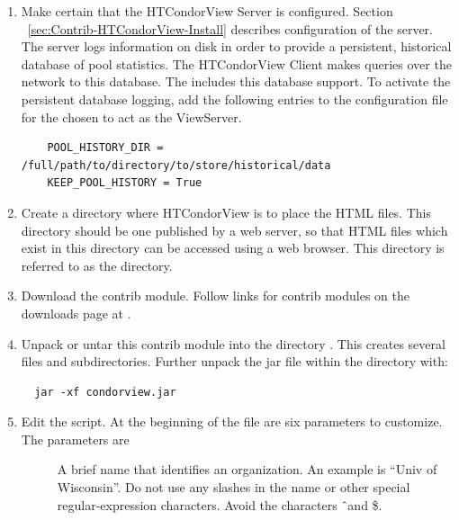 \begin{enumerate}

\item Make certain that the HTCondorView Server is configured.
Section ~\ref{sec:Contrib-HTCondorView-Install}
describes configuration of the server.
The server logs information on disk in order to provide a persistent,
historical database of pool statistics.
The HTCondorView Client makes queries over the network to this
database.
The  includes this database support.
To activate the persistent database logging, add the following entries to
the configuration file for the  chosen to act as the ViewServer.
\begin{verbatim}
    POOL_HISTORY_DIR = /full/path/to/directory/to/store/historical/data 
    KEEP_POOL_HISTORY = True 
\end{verbatim}

\item Create a directory where HTCondorView is to place the HTML files.  
This directory should be one published by a web server, so that HTML
files which exist in this directory can be accessed using a web browser.  
This directory is referred to as the  directory.

\item Download the  contrib module.
Follow links for contrib modules on the downloads page at
.

\item Unpack or untar this contrib module into the
directory .
This creates several files and subdirectories.
Further unpack the jar file within the  directory with:
\begin{verbatim} 
  jar -xf condorview.jar
\end{verbatim}

\item Edit the  script.  At the beginning of the file
are six parameters to customize.
The parameters are

        \begin{description}

	\item[] A brief name that identifies an
	organization. An example is ``Univ of Wisconsin''.  Do not
	use any slashes in the name or other special regular-expression
	characters. Avoid the characters \Bs \^\  and \$.


\end{description}
\end{enumerate}
